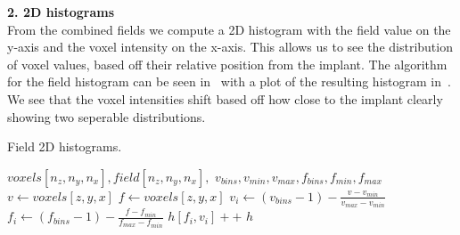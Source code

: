 \vspace{\baselineskip}
\noindent\textbf{2. 2D histograms} \\

From the combined fields we compute a 2D histogram with the field value on the y-axis and the voxel intensity on the x-axis. 
This allows us to see the distribution of voxel values, based off their relative position from the implant.
The algorithm for the field histogram can be seen in~ with a plot of the resulting histogram in~.
We see that the voxel intensities shift based off how close to the implant clearly showing two seperable distributions.

\begin{algorithm}
    \caption{Field 2D histograms.}
    \label{alg:field-hist}
    \begin{algorithmic}
         {$voxels[n_z,n_y,n_x], field[n_z,n_y,n_x],$ \newline $v_{bins}, v_{min}, v_{max}, f_{bins}, f_{min}, f_{max}$}
                \State $v \gets voxels[z,y,x]$
                    \State $f \gets voxels[z,y,x]$
                        \State $v_i \gets (v_{bins} - 1) - \frac{v - v_{min}}{v_{max} - v_{min}}$
                        \State $f_i \gets (f_{bins} - 1) - \frac{f - f_{min}}{f_{max} - f_{min}}$
                        \State $h[f_i,v_i]{+}{+}$
                    \EndIf
                \EndIf
            \EndFor
            \Return $h$
        \EndFunction
    \end{algorithmic}
\end{algorithm}

